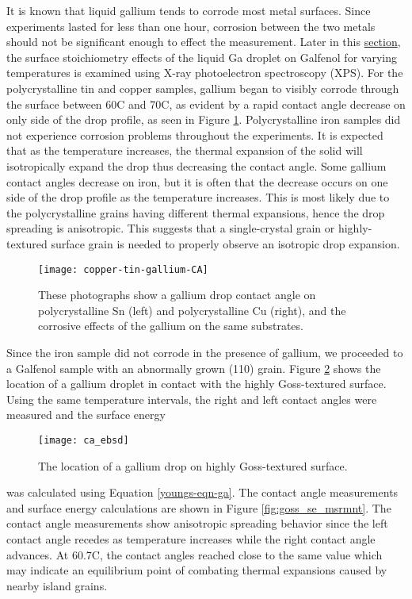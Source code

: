 It is known that liquid gallium tends to corrode most metal surfaces.\cite{Lewandowski2015,Narh1998,Fitzgerald1999} Since experiments lasted for less than one hour, corrosion between the two metals should not be significant enough to effect the measurement. Later in this \hyperlink{xps-gallium}{section}, the surface stoichiometry effects of the liquid Ga droplet on Galfenol for varying temperatures is examined using X-ray photoelectron spectroscopy (XPS). For the polycrystalline tin and copper samples, gallium began to visibly corrode through the surface between 60\degree C and 70\degree C, as evident by a rapid contact angle decrease on only side of the drop profile, as seen in Figure \ref{fig:copper-tin-gallium-CA}. Polycrystalline iron samples did not experience corrosion problems throughout the experiments. It is expected that as the temperature increases, the thermal expansion of the solid will isotropically expand the drop thus decreasing the contact angle. Some gallium contact angles decrease on iron, but it is often that the decrease occurs on one side of the drop profile as the temperature increases. This is most likely due to the polycrystalline grains having different thermal expansions, hence the drop spreading is anisotropic. This suggests that a single-crystal grain or highly-textured surface grain is needed to properly observe an isotropic drop expansion. 
\begin{figure}
	\centering
	\texttt{[image: copper-tin-gallium-CA]}
	\caption{These photographs show a gallium drop contact angle on polycrystalline Sn (left) and polycrystalline Cu (right), and the corrosive effects of the gallium on the same substrates.}
	\label{fig:copper-tin-gallium-CA}
\end{figure}



Since the iron sample did not corrode in the presence of gallium, we proceeded to a Galfenol sample with an abnormally grown \hkl(110) grain. Figure \ref{fig:ca_ebsd} shows the location of a gallium droplet in contact with the highly Goss-textured surface. Using the same temperature intervals, the right and left contact angles were measured and the surface energy
\begin{figure}
	\centering
	\texttt{[image: ca\_ebsd]}
	\caption{The location of a gallium drop on highly Goss-textured surface.}
	\label{fig:ca_ebsd}
\end{figure}
was calculated using Equation \ref{youngs-eqn-ga}. The contact angle measurements and surface energy calculations are shown in Figure \ref{fig:goss_se_msrmnt}. The contact angle measurements show anisotropic spreading behavior since the left contact angle recedes as temperature increases while the right contact angle advances. At 60.7\degree C, the contact angles reached close to the same value which may indicate an equilibrium point of combating thermal expansions caused by nearby island grains. 


